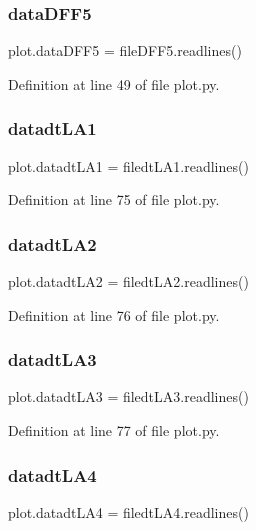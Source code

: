 \subsubsection{data\+D\+F\+F5}
{\footnotesize\ttfamily plot.\+data\+D\+F\+F5 = file\+D\+F\+F5.\+readlines()}



Definition at line 49 of file plot.\+py.

\mbox{\label{namespaceplot_a9c5639d2accd855d99f0e13a690a451f}} 
\subsubsection{datadt\+L\+A1}
{\footnotesize\ttfamily plot.\+datadt\+L\+A1 = filedt\+L\+A1.\+readlines()}



Definition at line 75 of file plot.\+py.

\mbox{\label{namespaceplot_a6a4f1d9b01e6bd146552ef06cdd9fe34}} 
\subsubsection{datadt\+L\+A2}
{\footnotesize\ttfamily plot.\+datadt\+L\+A2 = filedt\+L\+A2.\+readlines()}



Definition at line 76 of file plot.\+py.

\mbox{\label{namespaceplot_aff84a2499631bf6a59fd66f82f300f33}} 
\subsubsection{datadt\+L\+A3}
{\footnotesize\ttfamily plot.\+datadt\+L\+A3 = filedt\+L\+A3.\+readlines()}



Definition at line 77 of file plot.\+py.

\mbox{\label{namespaceplot_a517968e3f95c98504a4f8cd2ed616706}} 
\subsubsection{datadt\+L\+A4}
{\footnotesize\ttfamily plot.\+datadt\+L\+A4 = filedt\+L\+A4.\+readlines()}



